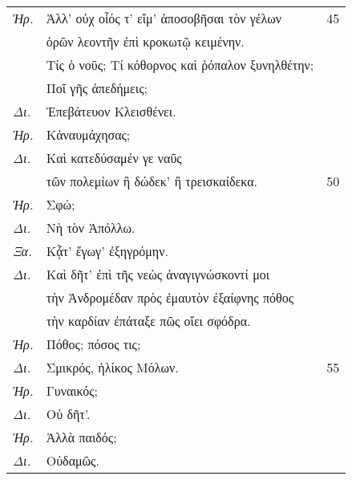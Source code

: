 \documentclass[13pt]{article}
\begin{document}
\begin{greek}
\begin{spacing}{1.5}
\begin{tabularx}{\textwidth}{@{}lXr@{}}
  \textit{Ἡρ.} & Ἀλλ' οὐχ οἷός τ' εἴμ' ἀποσοβῆσαι τὸν γέλων & 45 \\
  & ὁρῶν λεοντῆν ἐπὶ κροκωτῷ κειμένην. & \\
  & Τίς ὁ νοῦς; Τί κόθορνος καὶ ῥόπαλον ξυνηλθέτην; & \\
  & Ποῖ γῆς ἀπεδήμεις; & \\
  \textit{Δι.} & \hspace*{8em}Ἐπεβάτευον Κλεισθένει. & \\
  \textit{Ἡρ.} & Κἀναυμάχησας; & \\
  \textit{Δι.} & \hspace*{7em}Καὶ κατεδύσαμέν γε ναῦς & \\
  & τῶν πολεμίων ἢ δώδεκ' ἢ τρεισκαίδεκα. & 50 \\
  \textit{Ἡρ.} & Σφώ; & \\
  \textit{Δι.} & \hspace*{2.5em}Νὴ τὸν Ἀπόλλω. & \\
  \textit{Ξα.} & \hspace*{9.5em}Κᾆτ' ἔγωγ' ἐξηγρόμην. & \\
  \textit{Δι.} & Καὶ δῆτ' ἐπὶ τῆς νεὼς ἀναγιγνώσκοντί μοι & \\
  & τὴν Ἀνδρομέδαν πρὸς ἐμαυτὸν ἐξαίφνης πόθος & \\
  & τὴν καρδίαν ἐπάταξε πῶς οἴει σφόδρα. & \\
  \textit{Ἡρ.} & Πόθος; πόσος τις; & \\
  \textit{Δι.} & \hspace*{7.5em}Σμικρός, ἡλίκος Μόλων. & 55 \\
  \textit{Ἡρ.} & Γυναικός; & \\
  \textit{Δι.} & \hspace*{4em}Οὐ δῆτ'. & \\
  \textit{Ἡρ.} & \hspace*{7.5em}Ἀλλὰ παιδός; & \\
  \textit{Δι.} & \hspace*{13em}Οὐδαμῶς. & \\
\end{tabularx}

\end{spacing}

\newpage


\end{greek}
\end{document}
